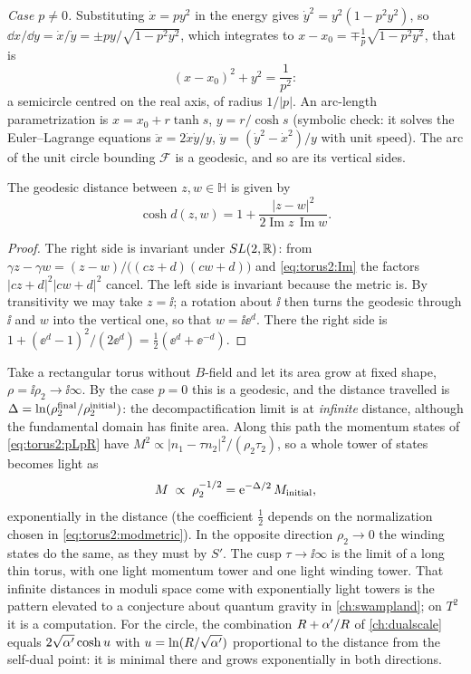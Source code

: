 \emph{Case $p\ne0$.} Substituting $\dot x=py^2$ in the energy gives
$\dot y^2=y^2(1-p^2y^2)$, so
$\dd x/\dd y=\dot x/\dot y=\pm py/\sqrt{1-p^2y^2}$, which integrates to
$x-x_0=\mp\frac1p\sqrt{1-p^2y^2}$, that is
\begin{equation}\label{eq:torus2:semicircle}
 (x-x_0)^2+y^2=\frac1{p^2}:
\end{equation}
a semicircle centred on the real axis, of radius $1/|p|$. An arc-length parametrization is
$x=x_0+r\tanh s$, $y=r/\cosh s$ (symbolic check: it solves the Euler--Lagrange equations
$\ddot x=2\dot x\dot y/y$, $\ddot y=(\dot y^2-\dot x^2)/y$ with unit speed). The arc of the
unit circle bounding $\mathcal F$ is a geodesic, and so are its vertical sides.

\begin{proposition}\label{thm:torus2:distance}
The geodesic distance between $z,w\in\mathbb H$ is given by
\begin{equation}\label{eq:torus2:distance}
 \cosh d(z,w)=1+\frac{|z-w|^2}{2\operatorname{Im}z\,\operatorname{Im}w}.
\end{equation}
\end{proposition}
\begin{proof}
The right side is invariant under $SL(2,\mathbb{R})$: from
$\gamma z-\gamma w=(z-w)/\big((cz+d)(cw+d)\big)$ and \eqref{eq:torus2:Im} the factors
$|cz+d|^2|cw+d|^2$ cancel. The left side is invariant because the metric is. By
transitivity we may take $z=\ii$; a rotation about $\ii$ then turns the geodesic through
$\ii$ and $w$ into the vertical one, so that $w=\ii\ee^{d}$. There the right side is
$1+(\ee^d-1)^2/(2\ee^d)=\frac12(\ee^d+\ee^{-d})$.
\end{proof}

\begin{physicsbox}
Take a rectangular torus without $B$-field and let its area grow at fixed shape,
$\rho=\ii\rho_2\to\ii\infty$. By the case $p=0$ this is a geodesic, and the distance travelled
is $\Delta=\ln(\rho_2^{\rm final}/\rho_2^{\rm initial})$: the decompactification limit is
at \emph{infinite} distance, although the fundamental domain has finite area. Along this
path the momentum states of \eqref{eq:torus2:pLpR} have
$M^2\propto|n_1-\tau n_2|^2/(\rho_2\tau_2)$, so a whole tower of states becomes light as
\[
 M\;\propto\;\rho_2^{-1/2}=\mathrm{e}^{-\Delta/2}\,M_{\rm initial},
\]
exponentially in the distance (the coefficient $\frac12$ depends on the normalization
chosen in \eqref{eq:torus2:modmetric}). In the opposite direction $\rho_2\to0$ the winding
states do the same, as they must by $S'$. The cusp $\tau\to\ii\infty$ is the limit of a
long thin torus, with one light momentum tower and one light winding tower. That infinite
distances in moduli space come with exponentially light towers is the pattern elevated to
a conjecture about quantum gravity in \cref{ch:swampland}; on $T^2$ it is a computation.
For the circle, the combination $R+\alpha'/R$ of \cref{ch:dualscale} equals
$2\sqrt{\alpha'}\cosh u$ with $u=\ln(R/\sqrt{\alpha'})$ proportional to the distance from the
self-dual point: it is minimal there and grows exponentially in both directions.
\end{physicsbox}

